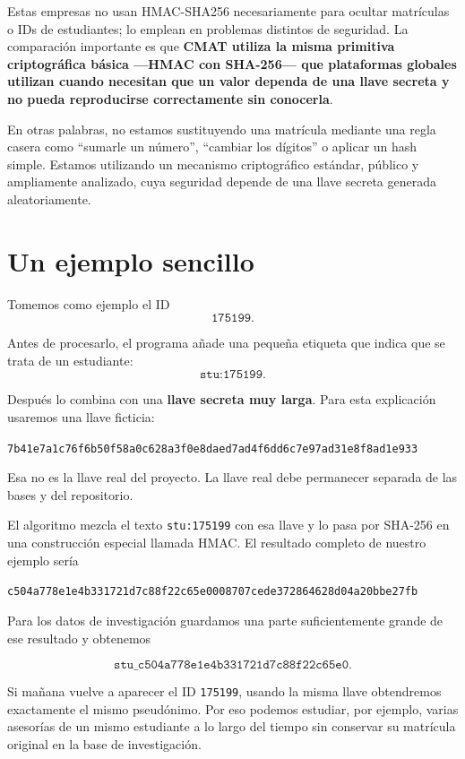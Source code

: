 \documentclass[11pt,a4paper]{article}
\begin{document}
Estas empresas no usan HMAC-SHA256 necesariamente para ocultar matrículas o IDs de estudiantes; lo emplean en problemas distintos de seguridad. La comparación importante es que \textbf{CMAT utiliza la misma primitiva criptográfica básica ---HMAC con SHA-256--- que plataformas globales utilizan cuando necesitan que un valor dependa de una llave secreta y no pueda reproducirse correctamente sin conocerla}.

En otras palabras, no estamos sustituyendo una matrícula mediante una regla casera como ``sumarle un número'', ``cambiar los dígitos'' o aplicar un hash simple. Estamos utilizando un mecanismo criptográfico estándar, público y ampliamente analizado, cuya seguridad depende de una llave secreta generada aleatoriamente.

\section{Un ejemplo sencillo}

Tomemos como ejemplo el ID
\[
\texttt{175199}.
\]

Antes de procesarlo, el programa añade una pequeña etiqueta que indica que se trata de un estudiante:
\[
\texttt{stu:175199}.
\]

Después lo combina con una \textbf{llave secreta muy larga}. Para esta explicación usaremos una llave ficticia:

\begin{center}
\small\nolinkurl{7b41e7a1c76f6b50f58a0c628a3f0e8daed7ad4f6dd6c7e97ad31e8f8ad1e933}
\end{center}

Esa no es la llave real del proyecto. La llave real debe permanecer separada de las bases y del repositorio.

El algoritmo mezcla el texto \texttt{stu:175199} con esa llave y lo pasa por SHA-256 en una construcción especial llamada HMAC. El resultado completo de nuestro ejemplo sería

\begin{center}
\small\nolinkurl{c504a778e1e4b331721d7c88f22c65e0008707cede372864628d04a20bbe27fb}
\end{center}

Para los datos de investigación guardamos una parte suficientemente grande de ese resultado y obtenemos

\[
\boxed{\texttt{stu\_c504a778e1e4b331721d7c88f22c65e0}}.
\]

Si mañana vuelve a aparecer el ID \texttt{175199}, usando la misma llave obtendremos exactamente el mismo pseudónimo. Por eso podemos estudiar, por ejemplo, varias asesorías de un mismo estudiante a lo largo del tiempo sin conservar su matrícula original en la base de investigación.
\end{document}

